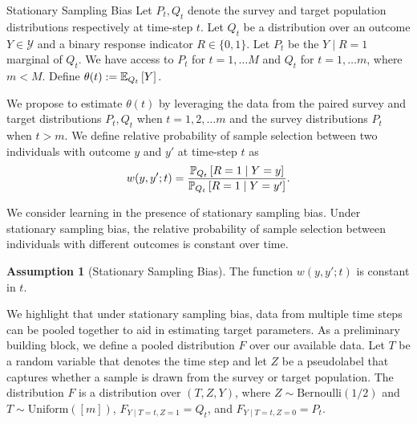 \documentclass{article}
\theoremstyle{definition}
\newtheorem{exam}{Example}
\newtheorem{assumption}{Assumption}
\theoremstyle{plain}
\theoremstyle{remark}
\begin{document}




\begin{section}{Stationary Sampling Bias}
Let $P_{t}, Q_{t}$ denote the survey and target population distributions respectively at time-step $t.$ Let $Q_{t}$ be a distribution over an outcome $Y \in \mathcal{Y}$ and a binary response indicator $R \in \{0, 1\}.$ Let $P_{t}$ be the $Y \mid R=1$ marginal of $Q_{t}$. We have access to $P_{t}$ for $t=1, \dots M$ and $Q_{t}$ for $t=1, \dots m$, where $m < M$. Define $\theta(t) := \EE[Q_{t}]{Y}.$

We propose to estimate $\theta(t)$ by leveraging the data from the paired survey and target distributions $P_{t}, Q_{t}$ when $t=1, 2, \dots m$ and the survey distributions $P_{t}$ when $t > m$. We define relative probability of sample selection between two individuals with outcome $y$ and $y'$ at time-step $t$ as 
\begin{equation} w(y, y'; t) = \frac{\PP[Q_{t}]{R=1 \mid Y=y}}{\PP[Q_{t}]{R=1 \mid Y= y'}}.\end{equation}

We consider learning in the presence of stationary sampling bias. Under stationary sampling bias, the relative probability of sample selection between individuals with different outcomes is constant over time. 
\begin{assumption}[Stationary Sampling Bias]
\label{assumption:stationary}
The function $w(y, y'; t)$ is constant in $t$.
\end{assumption}

We highlight that under stationary sampling bias, data from multiple time steps can be pooled together to aid in estimating target parameters. As a preliminary building block, we define a pooled distribution $F$ over our available data. Let $T$ be a random variable that denotes the time step and let $Z$ be a pseudolabel that captures whether a sample is drawn from the survey or target population. The distribution $F$ is a distribution over $(T, Z, Y)$, where $Z  \sim \text{Bernoulli}(1/2)$ and $T \sim \text{Uniform}([m])$, $F_{Y \mid T=t, Z=1} = Q_{t}$, and  $F_{Y \mid T=t, Z= 0} = P_{t}$.


\end{section}
\end{document}
